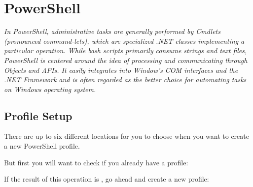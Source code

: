 \section{PowerShell}\label{powershell}

\begin{flushleft}
	\emph{In PowerShell, administrative tasks are generally performed by Cmdlets
		(pronounced command-lets), which are specialized .NET classes implementing a
		particular operation. While bash scripts primarily consume strings and text files,
		PowerShell is centered around the idea of processing and communicating through
		Objects and APIs. It easily integrates into Window's COM interfaces and the .NET
		Framework and is often regarded as the better choice for automating tasks on
		Windows operating system.}
\end{flushleft}

\subsection{Profile Setup}\label{powershell-profile-setup}

\begin{flushleft}
	There are up to six different locations for you to choose when you want to create
	a new PowerShell profile.
\end{flushleft}

\begin{flushleft}
\end{flushleft}

\begin{flushleft}
	But first you will want to check if you already have a profile:
\end{flushleft}

\begin{flushleft}
\end{flushleft}

\begin{flushleft}
	If the result of this operation is , go ahead and create a new profile:
\end{flushleft}

\begin{flushleft}
\end{flushleft}

